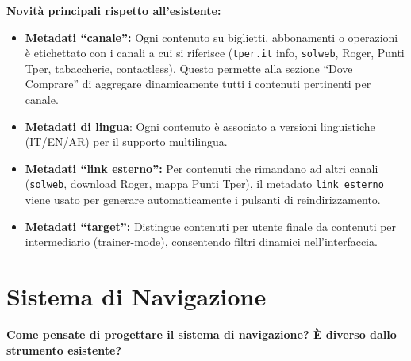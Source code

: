 \begin{tcolorbox}[colback=backgroundColor,colframe=borderColor,arc=2mm]
{\vspace{0.3cm}
\textbf{Novità principali rispetto all'esistente:}
\begin{itemize}
 \item \textbf{Metadati ``canale'':} Ogni contenuto su biglietti, abbonamenti o operazioni è etichettato con i canali a cui si riferisce (\texttt{tper.it} info, \texttt{solweb}, Roger, Punti Tper, tabaccherie, contactless). Questo permette alla sezione ``Dove Comprare'' di aggregare dinamicamente tutti i contenuti pertinenti per canale.
 \item \textbf{Metadati di lingua}: Ogni contenuto è associato a versioni linguistiche (IT/EN/AR) per il supporto multilingua.
 \item \textbf{Metadati ``link esterno'':} Per contenuti che rimandano ad altri canali (\texttt{solweb}, download Roger, mappa Punti Tper), il metadato \texttt{link\_esterno} viene usato per generare automaticamente i pulsanti di reindirizzamento.
 \item \textbf{Metadati ``target'':} Distingue contenuti per utente finale da contenuti per intermediario (trainer-mode), consentendo filtri dinamici nell'interfaccia.
\end{itemize}
}
\end{tcolorbox}

\vspace{0.5cm}

\section{Sistema di Navigazione}

\begin{tcolorbox}[colback=primaryColor!10,colframe=primaryColor,arc=2mm]
\large\textbf{Come pensate di progettare il sistema di navigazione? È diverso dallo strumento esistente?}
\end{tcolorbox}

\vspace{0.3cm}


